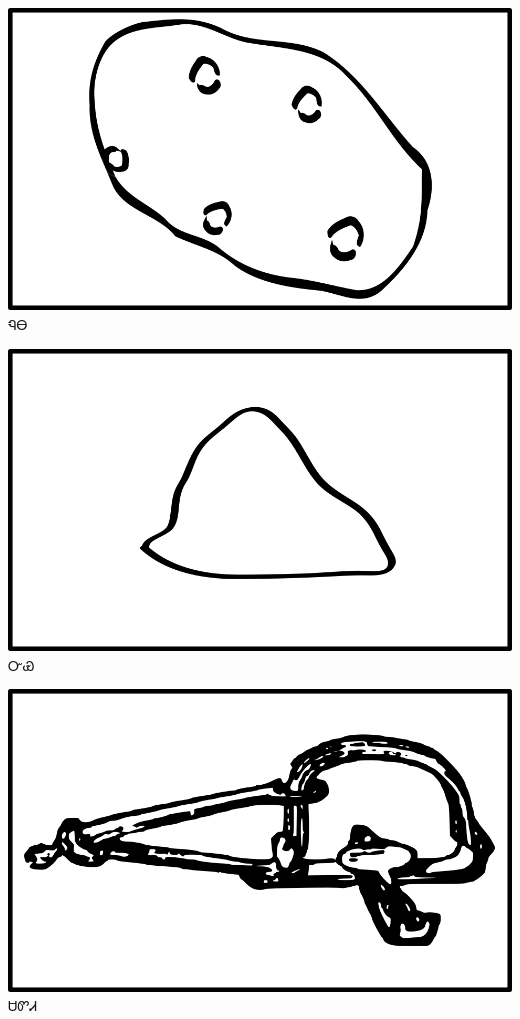 \documentclass[avery5371]{flashcards}%
\begin{document}
\begin{flashcard}{
\includegraphics[width=0.95\columnwidth,height=.51\columnwidth,keepaspectratio]{../artwork/objects-neutral/nuna}
}
\Huge ᏄᎾ
\end{flashcard}

\begin{flashcard}{
\includegraphics[width=0.95\columnwidth,height=.51\columnwidth,keepaspectratio]{../artwork/objects-neutral/nvya}
}
\Huge ᏅᏯ
\end{flashcard}

\begin{flashcard}{
\includegraphics[width=0.95\columnwidth,height=.51\columnwidth,keepaspectratio]{../artwork/objects-neutral/sadvdi}
}
\Huge ᏌᏛᏗ
\end{flashcard}
\end{document}
